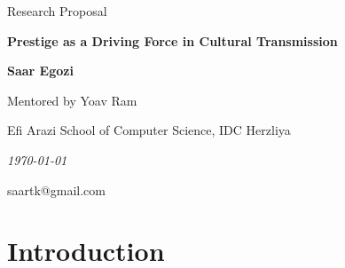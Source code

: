 \documentclass[11pt]{article}
\author{
	Dr. Yoav Ram
	\and
	Saar Egozi
}
\date{Autumn 2019}
\begin{document}
\begin{titlepage}
\centering

\vspace{4cm}

{\Large Research Proposal}

\vspace{2cm}

{\LARGE\bfseries Prestige as a Driving Force in Cultural Transmission}

\vspace{2cm}

{\large\bfseries Saar Egozi}

\vspace{1cm}

{\large Mentored by Yoav Ram}

\vspace{2cm}

\vfill

{\large Efi Arazi School of Computer Science, IDC Herzliya}

\vspace{1cm}

{\itshape \today}

{\large saartk@gmail.com}
\end{titlepage}

\clearpage
\renewcommand\linenumberfont{\normalfont\small\sffamily}
\section*{Introduction}




\end{document}
